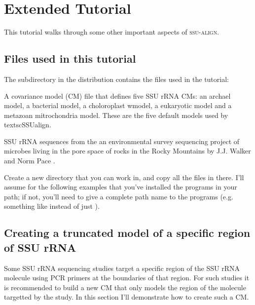 \section{Extended Tutorial}

This tutorial walks through some other important aspects of \textsc{ssu-align}.

\subsection{Files used in this tutorial}

The subdirectory  in the 
distribution contains the files used in the tutorial:

  \begin{sreitems}{}
  \item[\prog{ssu.default.1p0.cm}] A covariance model (CM) file that
    defines five SSU rRNA CMs: an archael model, a bacterial model, a
    choloroplast wmodel, a eukaryotic model and a metazoan
    mitrochondria model. These are the five default models used by
    textsc{SSUalign}.
  \item[\prog{rocks.fa}] SSU rRNA sequences from the an environmental
    survey sequencing project of microbes living in the pore space of
    rocks in the Rocky Mountains by J.J. Walker and Norm Pace
    \cite{Walker07}. 
  \end{sreitems}

Create a new directory that you can work in, and copy all the files in
 there. I'll assume for the following examples
that you've installed the  programs in your path;
if not, you'll need to give a complete path name to the programs
(e.g. something like
\newline
{} 
instead of just ).

\subsection{Creating a truncated model of a specific region of SSU rRNA}

Some SSU rRNA sequencing studies target a specific region of the SSU
rRNA molecule using PCR primers at the boundaries of that region. For
such studies it is recommended to build a new CM that only models the
region of the molecule targetted by the study. In this section I'll
demonstrate how to create such a CM.

